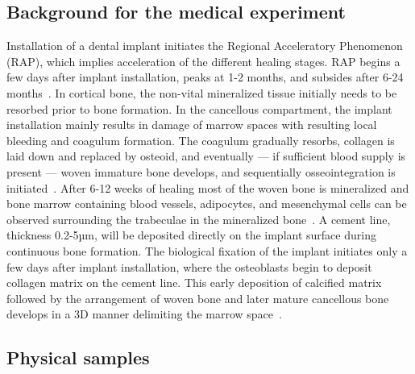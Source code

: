 \documentclass[pdflatex,sn-mathphys]{sn-jnl}%
\theoremstyle{thmstyleone}%
\theoremstyle{thmstyletwo}%
\theoremstyle{thmstylethree}%
\begin{document}

\subsection{Background for the medical experiment} Installation of a dental implant initiates the
Regional Acceleratory Phenomenon (RAP), which implies acceleration of the different healing stages.
RAP begins a few days after implant installation, peaks at 1-2 months, and subsides after 6-24
months~\cite{frost1989}. In cortical bone, the non-vital mineralized tissue initially needs to be
resorbed prior to bone formation. In the cancellous compartment, the implant installation mainly
results in damage of marrow spaces with resulting local bleeding and coagulum formation. The
coagulum gradually resorbs, collagen is laid down and replaced by osteoid, and eventually --- if
sufficient blood supply is present --- woven immature bone develops, and sequentially
osseointegration is initiated~\cite{frost1989}. After 6-12 weeks of healing most of the woven bone
is mineralized and bone marrow containing blood vessels, adipocytes, and mesenchymal cells can be
observed surrounding the trabeculae in the mineralized bone~\cite{Berglundh2003, Abrahamsson2004}.
A cement line, thickness  0.2-5µm, will be deposited directly on the implant surface during
continuous bone formation. The biological fixation of the implant initiates only a few days after
implant installation, where the osteoblasts begin to deposit collagen matrix on the cement line.
This early deposition of calcified matrix followed by the arrangement of woven bone and later mature
cancellous bone develops in a 3D manner delimiting the marrow space~\cite{Franchi2004}.

\subsection{Physical samples}
\end{document}
